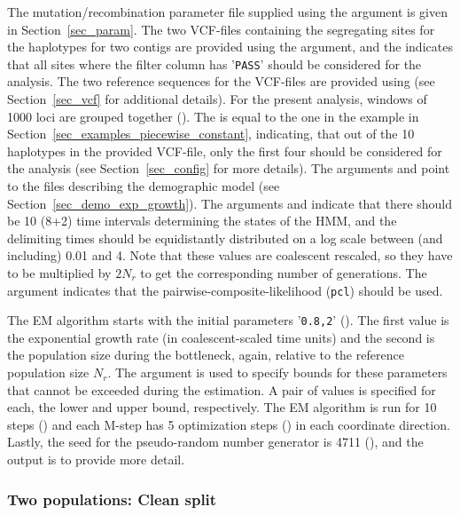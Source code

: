 \documentclass{article}
\numberwithin{equation}{section}
\begin{document}
The mutation/recombination parameter file supplied using the  argument is given in Section~\ref{sec_param}. The two VCF-files containing the segregating sites for the haplotypes for two contigs are provided using the  argument, and the  indicates that all sites where the filter column has '\texttt{PASS}' should be considered for the analysis. The two reference sequences for the VCF-files are provided using  (see Section~\ref{sec_vcf} for additional details). For the present analysis, windows of 1000 loci are grouped together (). The  is equal to the one in the example in Section~\ref{sec_examples_piecewise_constant}, indicating, that out of the 10 haplotypes in the provided VCF-file, only the first four should be considered for the analysis (see Section~\ref{sec_config} for more details). The arguments  and  point to the files describing the demographic model (see Section~\ref{sec_demo_exp_growth}). The arguments  and  indicate that there should be 10 (8+2) time intervals determining the states of the HMM, and the delimiting times should be equidistantly distributed on a log scale between (and including) 0.01 and 4. Note that these values are coalescent rescaled, so they have to be multiplied by $2N_r$ to get the corresponding number of generations. The argument  indicates that the pairwise-composite-likelihood (\texttt{pcl}) should be used.

The EM algorithm starts with the initial parameters '\texttt{0.8,2}' (). The first value is the exponential growth rate (in coalescent-scaled time units) and the second is the population size during the bottleneck, again, relative to the reference population size $N_r$. The argument  is used to specify bounds for these parameters that cannot be exceeded during the estimation. A pair of values is specified for each, the lower and upper bound, respectively. The EM algorithm is run for 10 steps () and each M-step has 5 optimization steps () in each coordinate direction. Lastly, the seed for the pseudo-random number generator is 4711 (), and the output is  to provide more detail.

\subsubsection{Two populations: Clean split}
\label{sec_examples_clean_split}
\end{document}
